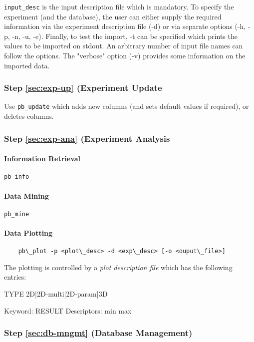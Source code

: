 \documentclass[12pt,a4paper]{article}
\begin{document}
\begin{itemize}
   \texttt{input\_desc} is the input description file which is mandatory. To specify the
   experiment (and the database), the user can either supply the required information 
   via the experiment description file (-d) or via separate options (-h, -p, -n, -u, -e).
   Finally, to test the import, -t can be specified which prints the values to be 
   imported on stdout. An arbitrary number of input file names can follow the options.
   The "verbose" option (-v) provides some information on the imported data.

\subsubsection{Step \ref{sec:exp-up} (Experiment Update}
   Use \texttt{pb\_update} which adds new columns (and sets default values if required), or
   deletes columns. 

\subsubsection{Step \ref{sec:exp-ana} (Experiment Analysis}
\paragraph{Information Retrieval}
   \texttt{pb\_info}

\paragraph{Data Mining}
   \texttt{pb\_mine}

\paragraph{Data Plotting}
\begin{verbatim}
    pb\_plot -p <plot\_desc> -d <exp\_desc> [-o <ouput\_file>]
\end{verbatim}

    The plotting is controlled by a \emph{plot description file} which has
    the following entries:

    TYPE 2D|2D-multi|2D-param|3D

    Keyword: RESULT 
    Descriptors:    min
                    max
                    

\subsubsection{Step \ref{sec:db-mngmt} (Database Management)}

\end{itemize}
\end{document}

